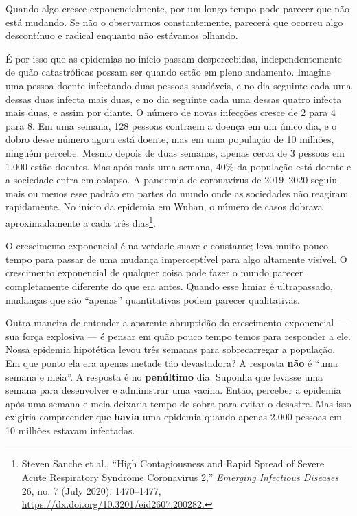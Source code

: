 Quando algo cresce exponencialmente, por um longo tempo pode parecer que não 
está mudando. Se não o observarmos constantemente, parecerá que ocorreu algo 
descontínuo e radical enquanto não estávamos olhando.

É por isso que as epidemias no início passam despercebidas, independentemente de
quão catastróficas possam ser quando estão em pleno andamento. Imagine uma
pessoa doente infectando duas pessoas saudáveis, e no dia seguinte cada uma
dessas duas infecta mais duas, e no dia seguinte cada uma dessas quatro infecta 
mais duas, e assim por diante. O número de novas infecções cresce de 2 para 4 
para 8. Em uma semana, 128 pessoas contraem a doença em um único dia, e o dobro 
desse número agora está doente, mas em uma população de 10 milhões, ninguém 
percebe. Mesmo depois de duas semanas, apenas cerca de 3 pessoas em 1.000 estão 
doentes. Mas após mais uma semana, 40\% da população está doente e a sociedade 
entra em colapso. A pandemia de coronavírus de 2019--2020 seguiu mais ou menos 
esse padrão em partes do mundo onde as sociedades não reagiram rapidamente. No 
início da epidemia em Wuhan, o número de casos dobrava aproximadamente a cada 
três dias\footnote{Steven Sanche et al., ``High Contagiousness and Rapid Spread
of Severe Acute Respiratory Syndrome Coronavirus 2,'' \textit{Emerging
Infectious Diseases} 26, no. 7 (July 2020): 1470--1477,
\url{https://dx.doi.org/10.3201/eid2607.200282.}}.

O crescimento exponencial é na verdade suave e constante; leva muito pouco 
tempo para passar de uma mudança imperceptível para algo altamente visível. O 
crescimento exponencial de qualquer coisa pode fazer o mundo parecer 
completamente diferente do que era antes. Quando esse limiar é ultrapassado, 
mudanças que são ``apenas'' quantitativas podem parecer qualitativas.

Outra maneira de entender a aparente abruptidão do crescimento exponencial ---
sua força explosiva --- é pensar em quão pouco tempo temos para responder a ele.
Nossa epidemia hipotética levou três semanas para sobrecarregar a população. Em 
que ponto ela era apenas metade tão devastadora? A resposta \textbf{não} é ``uma
semana e meia''. A resposta é no \textbf{penúltimo} dia. Suponha que levasse uma
semana para desenvolver e administrar uma vacina. Então, perceber a epidemia
após uma semana e meia deixaria tempo de sobra para evitar o desastre. Mas isso
exigiria compreender que \textbf{havia} uma epidemia quando apenas 2.000 pessoas
em 10 milhões estavam infectadas.

